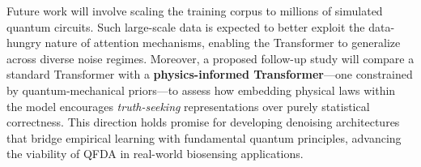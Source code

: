 \documentclass[11pt]{article}
\begin{document}
Future work will involve scaling the training corpus to millions of
simulated quantum circuits. Such large-scale data is expected to better
exploit the data-hungry nature of attention mechanisms, enabling the
Transformer to generalize across diverse noise regimes. Moreover, a
proposed follow-up study will compare a standard Transformer with a
\textbf{physics-informed Transformer}---one constrained by quantum-mechanical
priors---to assess how embedding physical laws within the model
encourages \emph{truth-seeking} representations over purely statistical
correctness. This direction holds promise for developing denoising
architectures that bridge empirical learning with fundamental quantum
principles, advancing the viability of QFDA in real-world biosensing
applications.
\end{document}
